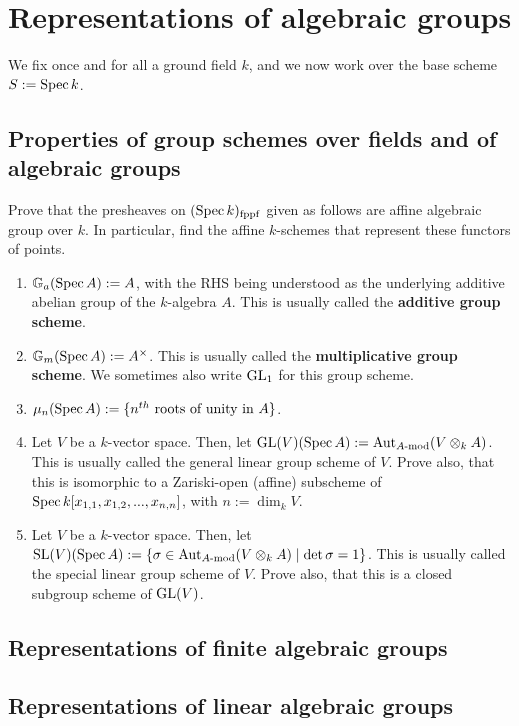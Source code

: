 \section{Representations of algebraic groups}
    \begin{convention}
        We fix once and for all a ground field $k$, and we now work over the base scheme $S := \operatorname{Spec} k$.
    \end{convention}

    \subsection{Properties of group schemes over fields and of algebraic groups}
        \begin{question}
            Prove that the presheaves on $(\operatorname{Spec} k)_{\mathrm{fppf}}$ given as follows are affine algebraic group over $k$. In particular, find the affine $k$-schemes that represent these functors of points.
            \begin{enumerate}
                \item $\mathbb{G}_a(\operatorname{Spec} A) := A$, with the RHS being understood as the underlying additive abelian group of the $k$-algebra $A$. This is usually called the \textbf{additive group scheme}.
                \item $\G_m(\Spec A) := A^{\x}$. This is usually called the \textbf{multiplicative group scheme}. We sometimes also write $\mathrm{GL}_1$ for this group scheme.
                \item $\mu_n(\operatorname{Spec} A) := \{ \text{$n^{th}$ roots of unity in $A$} \}$.
                \item Let $V$ be a $k$-vector space. Then, let $\GL(V)(\Spec A) := \Aut_{A\mod}(V \tensor_k A)$. This is usually called the general linear group scheme of $V$. Prove also, that this is isomorphic to a Zariski-open (affine) subscheme of $\operatorname{Spec} k[x_{1, 1}, x_{1, 2}, ..., x_{n, n}]$, with $n := \dim_k V$.
                \item Let $V$ be a $k$-vector space. Then, let $\SL(V)(\Spec A) := \{ \sigma \in \Aut_{A\mod}(V \tensor_k A) \mid \det \sigma = 1 \}$. This is usually called the special linear group scheme of $V$. Prove also, that this is a closed subgroup scheme of $\mathrm{GL}(V)$.
            \end{enumerate}
        \end{question}

    \subsection{Representations of finite algebraic groups}

    \subsection{Representations of linear algebraic groups}